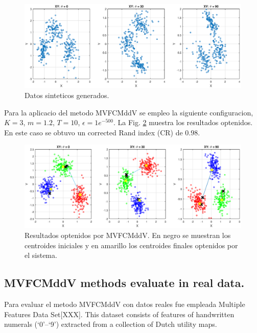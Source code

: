 \documentclass[12pt]{article}
\begin{document}
\begin{figure}[h]
\centering
\includegraphics[width=4.5in]{../out/xy-sinteticos.eps}
\caption{Datos sinteticos generados.}
\label{fig:xy_sinteticos}
\end{figure}  

Para la aplicacio del metodo MVFCMddV se empleo la siguiente configuracion, $K = 3$, $m = 1.2$, $T = 10$, $\epsilon = 1e^{-500}$. La Fig. \ref{fig:cluster_datos_sinteticos} muestra los resultados optenidos. En este caso se obtuvo un corrected Rand index (CR) de $0.98$.


\begin{figure}[h]
\centering
\includegraphics[width=4.5in]{../out/clusters-gauss-3.eps}
\caption{Resultados optenidos por MVFCMddV. En negro se muestran los centroides iniciales y en amarillo los centroides finales optenidos por el sistema.}
\label{fig:cluster_datos_sinteticos}
\end{figure}  


\subsection{MVFCMddV methods evaluate in real data.}

Para evaluar el metodo  MVFCMddV con datos reales fue empleada Multiple Features Data Set[XXX]. This dataset consists of features of handwritten numerals (`0'--`9') extracted from a collection of Dutch utility maps.
\end{document}
